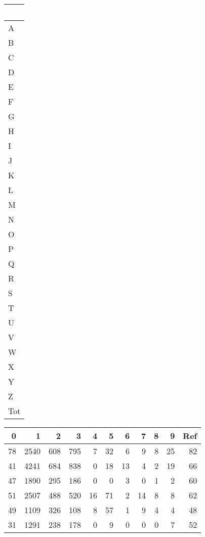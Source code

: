  \begin{table}[hb]
  \begin{tabular}{|l|}\hline
   ~\\ \hline\hline
   A\\ \hline
   B\\ \hline
   C\\ \hline
   D\\ \hline
   E\\ \hline
   F\\ \hline
   G\\ \hline
   H\\ \hline
   I\\ \hline
   J\\ \hline
   K\\ \hline
   L\\ \hline
   M\\ \hline
   N\\ \hline
   O\\ \hline
   P\\ \hline
   Q\\ \hline
   R\\ \hline
   S\\ \hline
   T\\ \hline
   U\\ \hline
   V\\ \hline
   W\\ \hline
   X\\ \hline
   Y\\ \hline
   Z\\ \hline\hline
   Tot\\ \hline
  \end{tabular}
  \begin{tabular}{|r|r|r|r|r|r|r|r|r|r|r|%
   }\hline
   0     &1     &2    &3   &4   &5   &6   &7  &8   &9  &Ref   %
   \\ \hline\hline
   78  &2540   &608  &795   &7  &32   &6   &9  &8  &25   &82   %
   \\ \hline
   41  &4241   &684  &838   &0  &18  &13   &4  &2  &19   &66   %
   \\ \hline
   47  &1890   &295  &186   &0   &0   &3   &0  &1   &2   &60   %
   \\ \hline
   51  &2507   &488  &520  &16  &71   &2  &14  &8   &8   &62   %
   \\ \hline
   49  &1109   &326  &108   &8  &57   &1   &9  &4   &4   &48   %
   \\ \hline
   31  &1291   &238  &178   &0   &9   &0   &0  &0   &7   &52   %

\end{tabular}
\end{table}
